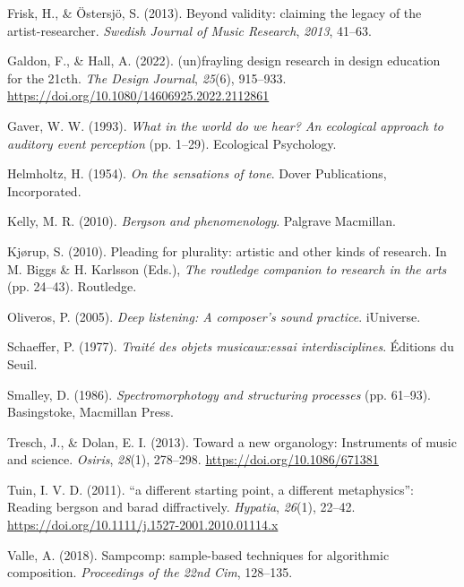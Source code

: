 \documentclass[11pt]{article}
\begin{document}
\begin{hangparas}{1.5em}{1}
\hypertarget{citeproc_bib_item_13}{Frisk, H., \& Östersjö, S. (2013). Beyond validity: claiming the legacy of the artist-researcher. \textit{Swedish Journal of Music Research}, \textit{2013}, 41–63.}

\hypertarget{citeproc_bib_item_14}{Galdon, F., \& Hall, A. (2022). (un)frayling design research in design education for the 21cth. \textit{The Design Journal}, \textit{25}(6), 915–933. \url{https://doi.org/10.1080/14606925.2022.2112861}}

\hypertarget{citeproc_bib_item_15}{Gaver, W. W. (1993). \textit{What in the world do we hear? An ecological approach to auditory event perception} (pp. 1–29). Ecological Psychology.}

\hypertarget{citeproc_bib_item_16}{Helmholtz, H. (1954). \textit{On the sensations of tone}. Dover Publications, Incorporated.}

\hypertarget{citeproc_bib_item_17}{Kelly, M. R. (2010). \textit{Bergson and phenomenology}. Palgrave Macmillan.}

\hypertarget{citeproc_bib_item_18}{Kjørup, S. (2010). Pleading for plurality: artistic and other kinds of research. In M. Biggs \& H. Karlsson (Eds.), \textit{The routledge companion to research in the arts} (pp. 24–43). Routledge.}

\hypertarget{citeproc_bib_item_19}{Oliveros, P. (2005). \textit{Deep listening: A composer’s sound practice}. iUniverse.}

\hypertarget{citeproc_bib_item_20}{Schaeffer, P. (1977). \textit{Traité des objets musicaux:essai interdisciplines}. Éditions du Seuil.}

\hypertarget{citeproc_bib_item_21}{Smalley, D. (1986). \textit{Spectromorphotogy and structuring processes} (pp. 61–93). Basingstoke, Macmillan Press.}

\hypertarget{citeproc_bib_item_22}{Tresch, J., \& Dolan, E. I. (2013). Toward a new organology: Instruments of music and science. \textit{Osiris}, \textit{28}(1), 278–298. \url{https://doi.org/10.1086/671381}}

\hypertarget{citeproc_bib_item_23}{Tuin, I. V. D. (2011). “a different starting point, a different metaphysics”: Reading bergson and barad diffractively. \textit{Hypatia}, \textit{26}(1), 22–42. \url{https://doi.org/10.1111/j.1527-2001.2010.01114.x}}

\hypertarget{citeproc_bib_item_24}{Valle, A. (2018). Sampcomp: sample-based techniques for algorithmic composition. \textit{Proceedings of the 22nd Cim}, 128–135.}\bigskip
\end{hangparas}
\end{document}
